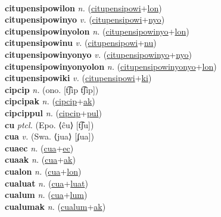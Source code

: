  \label{citupensipowi} \\
\textbf{citupensipowilon} \textit{n.} (\hyperref[citupensipowi]{citupensipowi}+\hyperref[lon]{lon})
 \label{citupensipowilon} \\
\textbf{citupensipowinyo} \textit{v.} (\hyperref[citupensipowi]{citupensipowi}+\hyperref[nyo]{nyo})
 \label{citupensipowinyo} \\
\textbf{citupensipowinyolon} \textit{n.} (\hyperref[citupensipowinyo]{citupensipowinyo}+\hyperref[lon]{lon})
 \label{citupensipowinyolon} \\
\textbf{citupensipowinu} \textit{v.} (\hyperref[citupensipowi]{citupensipowi}+\hyperref[nu]{nu})
 \label{citupensipowinu} \\
\textbf{citupensipowinyonyo} \textit{v.} (\hyperref[citupensipowinyo]{citupensipowinyo}+\hyperref[nyo]{nyo})
 \label{citupensipowinyonyo} \\
\textbf{citupensipowinyonyolon} \textit{n.} (\hyperref[citupensipowinyonyo]{citupensipowinyonyo}+\hyperref[lon]{lon})
 \label{citupensipowinyonyolon} \\
\textbf{citupensipowiki} \textit{v.} (\hyperref[citupensipowi]{citupensipowi}+\hyperref[ki]{ki})
 \label{citupensipowiki} \\
\textbf{cipcip} \textit{n.} (ono. [t͡ʃip t͡ʃip])
 \label{cipcip} \\
\textbf{cipcipak} \textit{n.} (\hyperref[cipcip]{cipcip}+\hyperref[ak]{ak})
 \label{cipcipak} \\
\textbf{cipcippul} \textit{n.} (\hyperref[cipcip]{cipcip}+\hyperref[pul]{pul})
 \label{cipcippul} \\
\textbf{cu} \textit{ptcl.} (Epo. ⟨ĉu⟩ [t͡ʃu])
 \label{cu} \\
\textbf{cua} \textit{v.} (Swa. ⟨jua⟩ [ʄua])
 \label{cua} \\
\textbf{cuaec} \textit{n.} (\hyperref[cua]{cua}+\hyperref[ec]{ec})
 \label{cuaec} \\
\textbf{cuaak} \textit{n.} (\hyperref[cua]{cua}+\hyperref[ak]{ak})
 \label{cuaak} \\
\textbf{cualon} \textit{n.} (\hyperref[cua]{cua}+\hyperref[lon]{lon})
 \label{cualon} \\
\textbf{cualuat} \textit{n.} (\hyperref[cua]{cua}+\hyperref[luat]{luat})
 \label{cualuat} \\
\textbf{cualum} \textit{n.} (\hyperref[cua]{cua}+\hyperref[lum]{lum})
 \label{cualum} \\
\textbf{cualumak} \textit{n.} (\hyperref[cualum]{cualum}+\hyperref[ak]{ak})
 \label{cualumak} \\
